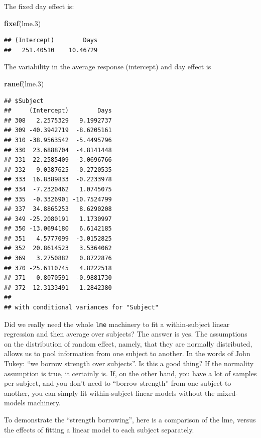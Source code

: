 \documentclass[]{book}
\newenvironment{Shaded}{\begin{snugshade}}{\end{snugshade}}
\newcommand{\KeywordTok}[1]{\textcolor[rgb]{0.13,0.29,0.53}{\textbf{#1}}}
\newcommand{\DecValTok}[1]{\textcolor[rgb]{0.00,0.00,0.81}{#1}}
\newcommand{\NormalTok}[1]{#1}
\theoremstyle{definition}
\theoremstyle{definition}
\theoremstyle{definition}
\theoremstyle{remark}
\begin{document}
The fixed day effect is:

\begin{Shaded}
\begin{Highlighting}[]
\KeywordTok{fixef}\NormalTok{(lme.}\DecValTok{3}\NormalTok{)}
\end{Highlighting}
\end{Shaded}

\begin{verbatim}
## (Intercept)        Days 
##   251.40510    10.46729
\end{verbatim}

The variability in the average response (intercept) and day effect is

\begin{Shaded}
\begin{Highlighting}[]
\KeywordTok{ranef}\NormalTok{(lme.}\DecValTok{3}\NormalTok{)}
\end{Highlighting}
\end{Shaded}

\begin{verbatim}
## $Subject
##     (Intercept)        Days
## 308   2.2575329   9.1992737
## 309 -40.3942719  -8.6205161
## 310 -38.9563542  -5.4495796
## 330  23.6888704  -4.8141448
## 331  22.2585409  -3.0696766
## 332   9.0387625  -0.2720535
## 333  16.8389833  -0.2233978
## 334  -7.2320462   1.0745075
## 335  -0.3326901 -10.7524799
## 337  34.8865253   8.6290208
## 349 -25.2080191   1.1730997
## 350 -13.0694180   6.6142185
## 351   4.5777099  -3.0152825
## 352  20.8614523   3.5364062
## 369   3.2750882   0.8722876
## 370 -25.6110745   4.8222518
## 371   0.8070591  -0.9881730
## 372  12.3133491   1.2842380
## 
## with conditional variances for "Subject"
\end{verbatim}

Did we really need the whole \texttt{lme} machinery to fit a
within-subject linear regression and then average over subjects? The
answer is yes. The assumptions on the distribution of random effect,
namely, that they are normally distributed, allows us to pool
information from one subject to another. In the words of John Tukey:
``we borrow strength over subjects''. Is this a good thing? If the
normality assumption is true, it certainly is. If, on the other hand,
you have a lot of samples per subject, and you don't need to ``borrow
strength'' from one subject to another, you can simply fit
within-subject linear models without the mixed-models machinery.

To demonstrate the ``strength borrowing'', here is a comparison of the
lme, versus the effects of fitting a linear model to each subject
separately.
\end{document}
